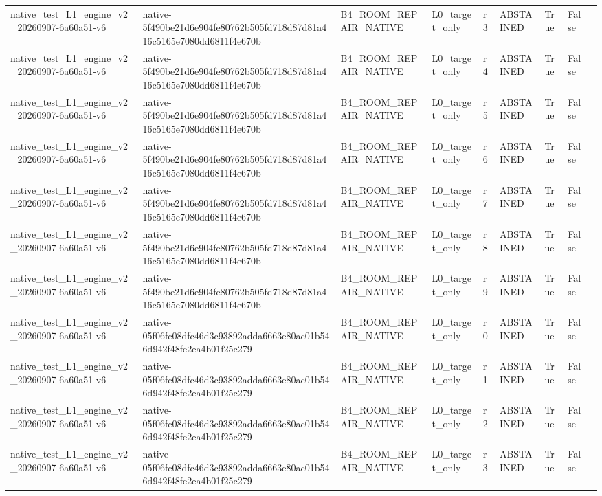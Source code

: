 \begin{tabular}{lllllllll}
native\_test\_L1\_engine\_v2\_20260907-6a60a51-v6 & native-5f490be21d6e904fe80762b505fd718d87d81a416c5165e7080dd6811f4e670b & B4\_ROOM\_REPAIR\_NATIVE & L0\_target\_only & r3 & ABSTAINED & True & False &  \\
native\_test\_L1\_engine\_v2\_20260907-6a60a51-v6 & native-5f490be21d6e904fe80762b505fd718d87d81a416c5165e7080dd6811f4e670b & B4\_ROOM\_REPAIR\_NATIVE & L0\_target\_only & r4 & ABSTAINED & True & False &  \\
native\_test\_L1\_engine\_v2\_20260907-6a60a51-v6 & native-5f490be21d6e904fe80762b505fd718d87d81a416c5165e7080dd6811f4e670b & B4\_ROOM\_REPAIR\_NATIVE & L0\_target\_only & r5 & ABSTAINED & True & False &  \\
native\_test\_L1\_engine\_v2\_20260907-6a60a51-v6 & native-5f490be21d6e904fe80762b505fd718d87d81a416c5165e7080dd6811f4e670b & B4\_ROOM\_REPAIR\_NATIVE & L0\_target\_only & r6 & ABSTAINED & True & False &  \\
native\_test\_L1\_engine\_v2\_20260907-6a60a51-v6 & native-5f490be21d6e904fe80762b505fd718d87d81a416c5165e7080dd6811f4e670b & B4\_ROOM\_REPAIR\_NATIVE & L0\_target\_only & r7 & ABSTAINED & True & False &  \\
native\_test\_L1\_engine\_v2\_20260907-6a60a51-v6 & native-5f490be21d6e904fe80762b505fd718d87d81a416c5165e7080dd6811f4e670b & B4\_ROOM\_REPAIR\_NATIVE & L0\_target\_only & r8 & ABSTAINED & True & False &  \\
native\_test\_L1\_engine\_v2\_20260907-6a60a51-v6 & native-5f490be21d6e904fe80762b505fd718d87d81a416c5165e7080dd6811f4e670b & B4\_ROOM\_REPAIR\_NATIVE & L0\_target\_only & r9 & ABSTAINED & True & False &  \\
native\_test\_L1\_engine\_v2\_20260907-6a60a51-v6 & native-05f06fc08dfc46d3c93892adda6663e80ac01b546d942f48fe2ea4b01f25c279 & B4\_ROOM\_REPAIR\_NATIVE & L0\_target\_only & r0 & ABSTAINED & True & False &  \\
native\_test\_L1\_engine\_v2\_20260907-6a60a51-v6 & native-05f06fc08dfc46d3c93892adda6663e80ac01b546d942f48fe2ea4b01f25c279 & B4\_ROOM\_REPAIR\_NATIVE & L0\_target\_only & r1 & ABSTAINED & True & False &  \\
native\_test\_L1\_engine\_v2\_20260907-6a60a51-v6 & native-05f06fc08dfc46d3c93892adda6663e80ac01b546d942f48fe2ea4b01f25c279 & B4\_ROOM\_REPAIR\_NATIVE & L0\_target\_only & r2 & ABSTAINED & True & False &  \\
native\_test\_L1\_engine\_v2\_20260907-6a60a51-v6 & native-05f06fc08dfc46d3c93892adda6663e80ac01b546d942f48fe2ea4b01f25c279 & B4\_ROOM\_REPAIR\_NATIVE & L0\_target\_only & r3 & ABSTAINED & True & False &  \\

\end{tabular}
